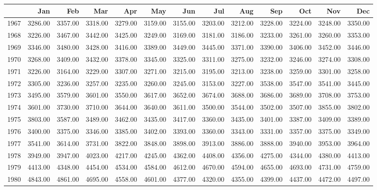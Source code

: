 \begin{longtable}{rrrrrrrrrrrrr}
  \hline
 & Jan & Feb & Mar & Apr & May & Jun & Jul & Aug & Sep & Oct & Nov & Dec \\ 
  \hline
1967 & 3286.00 & 3357.00 & 3318.00 & 3279.00 & 3159.00 & 3155.00 & 3203.00 & 3212.00 & 3228.00 & 3224.00 & 3248.00 & 3350.00 \\ 
  1968 & 3226.00 & 3467.00 & 3442.00 & 3425.00 & 3249.00 & 3169.00 & 3181.00 & 3186.00 & 3233.00 & 3261.00 & 3260.00 & 3353.00 \\ 
  1969 & 3346.00 & 3480.00 & 3428.00 & 3416.00 & 3389.00 & 3449.00 & 3445.00 & 3371.00 & 3390.00 & 3406.00 & 3452.00 & 3446.00 \\ 
  1970 & 3268.00 & 3409.00 & 3432.00 & 3378.00 & 3345.00 & 3325.00 & 3311.00 & 3275.00 & 3232.00 & 3246.00 & 3274.00 & 3308.00 \\ 
  1971 & 3226.00 & 3164.00 & 3229.00 & 3307.00 & 3271.00 & 3215.00 & 3195.00 & 3213.00 & 3238.00 & 3259.00 & 3301.00 & 3258.00 \\ 
  1972 & 3305.00 & 3236.00 & 3257.00 & 3235.00 & 3260.00 & 3245.00 & 3153.00 & 3227.00 & 3538.00 & 3547.00 & 3541.00 & 3445.00 \\ 
  1973 & 3495.00 & 3579.00 & 3601.00 & 3550.00 & 3617.00 & 3652.00 & 3674.00 & 3688.00 & 3686.00 & 3689.00 & 3708.00 & 3753.00 \\ 
  1974 & 3601.00 & 3730.00 & 3710.00 & 3644.00 & 3640.00 & 3611.00 & 3500.00 & 3544.00 & 3502.00 & 3507.00 & 3855.00 & 3802.00 \\ 
  1975 & 3803.00 & 3587.00 & 3489.00 & 3462.00 & 3435.00 & 3417.00 & 3360.00 & 3435.00 & 3401.00 & 3387.00 & 3409.00 & 3389.00 \\ 
  1976 & 3400.00 & 3375.00 & 3346.00 & 3385.00 & 3402.00 & 3393.00 & 3360.00 & 3343.00 & 3331.00 & 3357.00 & 3375.00 & 3349.00 \\ 
  1977 & 3541.00 & 3614.00 & 3731.00 & 3822.00 & 3848.00 & 3898.00 & 3913.00 & 3886.00 & 3888.00 & 3940.00 & 3953.00 & 3964.00 \\ 
  1978 & 3949.00 & 3947.00 & 4023.00 & 4217.00 & 4245.00 & 4362.00 & 4408.00 & 4356.00 & 4275.00 & 4344.00 & 4380.00 & 4413.00 \\ 
  1979 & 4413.00 & 4348.00 & 4454.00 & 4534.00 & 4584.00 & 4612.00 & 4670.00 & 4594.00 & 4655.00 & 4693.00 & 4731.00 & 4759.00 \\ 
  1980 & 4843.00 & 4861.00 & 4695.00 & 4558.00 & 4601.00 & 4377.00 & 4320.00 & 4355.00 & 4399.00 & 4437.00 & 4472.00 & 4497.00 \\ 

\end{longtable}
